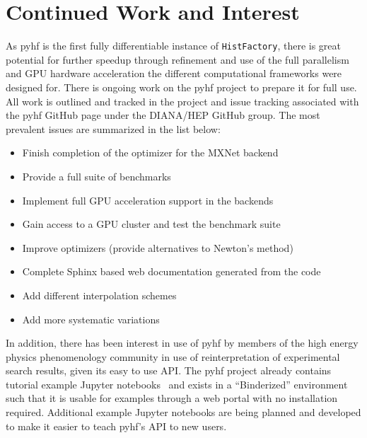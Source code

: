 \section{Continued Work and Interest}\label{section:continued_work}

As pyhf is the first fully differentiable instance of \texttt{HistFactory}, there is great potential for further speedup through refinement and use of the full parallelism and GPU hardware acceleration the different computational frameworks were designed for.
There is ongoing work on the pyhf project to prepare it for full use.
All work is outlined and tracked in the project and issue tracking associated with the pyhf GitHub page under the DIANA/HEP GitHub group.
The most prevalent issues are summarized in the list below:

\begin{itemize}
 \item Finish completion of the optimizer for the MXNet backend
 \item Provide a full suite of benchmarks
 \item Implement full GPU acceleration support in the backends
 \item Gain access to a GPU cluster and test the benchmark suite
 \item Improve optimizers (provide alternatives to Newton's method)
 \item Complete Sphinx based web documentation generated from the code
 \item Add different interpolation schemes
 \item Add more systematic variations
\end{itemize}

In addition, there has been interest in use of pyhf by members of the high energy physics phenomenology community in use of reinterpretation of experimental search results, given its easy to use API.
The pyhf project already contains tutorial example Jupyter notebooks~\cite{Kluyver:2016aa} and exists in a ``Binderized'' environment~\cite{Binder} such that it is usable for examples through a web portal with no installation required.
Additional example Jupyter notebooks are being planned and developed to make it easier to teach pyhf's API to new users.
